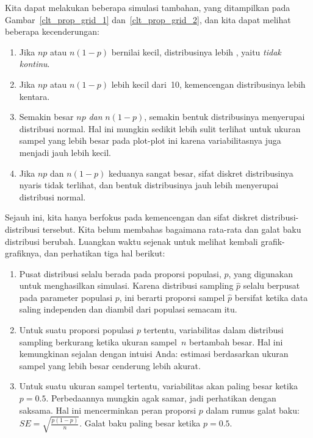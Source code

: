 Kita dapat melakukan beberapa simulasi tambahan,
yang ditampilkan pada
Gambar~\ref{clt_prop_grid_1}
dan~\ref{clt_prop_grid_2},
dan kita dapat melihat beberapa kecenderungan:
\begin{enumerate}
\item Jika $np$ atau $n(1 - p)$ bernilai kecil,
    distribusinya lebih ,
    yaitu \emph{tidak kontinu}.
\item Jika $np$ atau $n(1-p)$ lebih kecil dari~10,
    kemencengan distribusinya lebih kentara.
\item Semakin besar $np$ \emph{dan} $n(1 - p)$,
    semakin bentuk distribusinya menyerupai distribusi normal.
    Hal ini mungkin sedikit lebih sulit terlihat untuk ukuran
    sampel yang lebih besar pada plot-plot ini karena variabilitasnya
    juga menjadi jauh lebih kecil.
\item Jika $np$ dan $n(1 - p)$ keduanya sangat besar,
    sifat diskret distribusinya nyaris tidak terlihat,
    dan bentuk distribusinya jauh lebih
    menyerupai distribusi normal.
\end{enumerate}


Sejauh ini, kita hanya berfokus pada kemencengan dan sifat diskret
distribusi-distribusi tersebut.
Kita belum membahas bagaimana rata-rata dan galat baku
distribusi berubah.
Luangkan waktu sejenak untuk melihat kembali grafik-grafiknya,
dan perhatikan tiga hal berikut:
\begin{enumerate}
\item Pusat distribusi selalu berada pada
    proporsi populasi, $p$, yang digunakan untuk
    menghasilkan simulasi. Karena distribusi
    sampling $\hat{p}$ selalu berpusat pada
    parameter populasi $p$, ini berarti proporsi
    sampel $\hat{p}$ bersifat  ketika
    data saling independen dan diambil dari
    populasi semacam itu.
\item Untuk suatu proporsi populasi $p$ tertentu,
    variabilitas dalam distribusi sampling
    berkurang ketika ukuran sampel~$n$ bertambah besar.
    Hal ini kemungkinan sejalan dengan intuisi Anda:
    estimasi berdasarkan ukuran sampel yang lebih besar
    cenderung lebih akurat.
\item Untuk suatu ukuran sampel tertentu, variabilitas
    akan paling besar ketika $p = 0.5$. Perbedaannya
    mungkin agak samar, jadi perhatikan dengan saksama.
    Hal ini mencerminkan peran proporsi
    $p$ dalam rumus galat baku:
    $SE = \sqrt{\frac{p (1 - p)}{n}}$.
    Galat baku paling besar ketika $p = 0.5$.
\end{enumerate}

